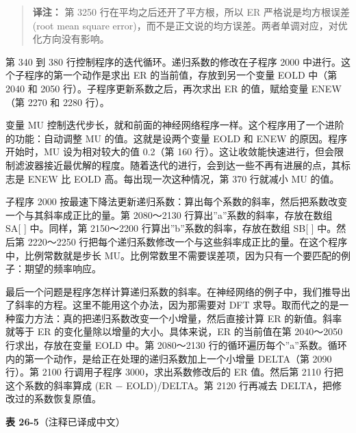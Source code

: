 \begin{quote}
\textbf{译注：} 第 3250 行在平均之后还开了平方根，所以 ER
严格说是均方根误差(root mean square
error)，而不是正文说的均方误差。两者单调对应，对优化方向没有影响。
\end{quote}

第 340 到 380 行控制程序的迭代循环。递归系数的修改在子程序 2000
中进行。这个子程序的第一个动作是求出 ER 的当前值，存放到另一个变量 EOLD
中（第 2040 和 2050 行）。子程序更新系数之后，再次求出 ER 的值，赋给变量
ENEW（第 2270 和 2280 行）。

变量 MU
控制迭代步长，就和前面的神经网络程序一样。这个程序用了一个进阶的功能：自动调整
MU 的值。这就是设两个变量 EOLD 和 ENEW 的原因。程序开始时，MU
设为相对较大的值 0.2（第 160
行）。这让收敛能快速进行，但会限制滤波器接近最优解的程度。随着迭代的进行，会到达一些不再有进展的点，其标志是
ENEW 比 EOLD 高。每出现一次这种情况，第 370 行就减小 MU 的值。

子程序 2000
按最速下降法更新递归系数：算出每个系数的斜率，然后把系数改变一个与其斜率成正比的量。第
2080～2130 行算出''a''系数的斜率，存放在数组 SA{[} {]} 中。同样，第
2150～2200 行算出''b''系数的斜率，存放在数组 SB{[} {]} 中。然后第
2220～2250
行把每个递归系数修改一个与这些斜率成正比的量。在这个程序中，比例常数就是步长
MU。比例常数里不需要误差项，因为只有一个要匹配的例子：期望的频率响应。

最后一个问题是程序怎样计算递归系数的斜率。在神经网络的例子中，我们推导出了斜率的方程。这里不能用这个办法，因为那需要对
DFT
求导。取而代之的是一种蛮力方法：真的把递归系数改变一个小增量，然后直接计算
ER 的新值。斜率就等于 ER 的变化量除以增量的大小。具体来说，ER
的当前值在第 2040～2050 行求出，存放在变量 EOLD 中。第 2080～2130
行的循环遍历每个''a''系数。循环内的第一个动作，是给正在处理的递归系数加上一个小增量
DELTA（第 2090 行）。第 2100 行调用子程序 3000，求出系数修改后的 ER
值。然后第 2110 行把这个系数的斜率算成 (ER − EOLD)/DELTA。第 2120
行再减去 DELTA，把修改过的系数恢复原值。

\textbf{表 26-5}（注释已译成中文）

